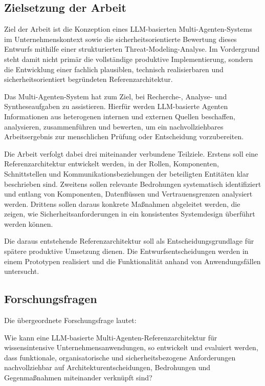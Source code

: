 \newpage

\subsection{Zielsetzung der Arbeit}

Ziel der Arbeit ist die Konzeption eines LLM-basierten Multi-Agenten-Systems im Unternehmenskontext sowie die sicherheitsorientierte Bewertung dieses Entwurfs mithilfe einer strukturierten Threat-Modeling-Analyse. Im Vordergrund steht damit nicht primär die vollständige produktive Implementierung, sondern die Entwicklung einer fachlich plausiblen, technisch realisierbaren und sicherheitsorientiert begründeten Referenzarchitektur.

Das Multi-Agenten-System hat zum Ziel, bei Recherche-, Analyse- und Syntheseaufgaben zu assistieren. Hierfür werden LLM-basierte Agenten Informationen aus heterogenen internen und externen Quellen beschaffen, analysieren, zusammenführen und bewerten, um ein nachvollziehbares Arbeitsergebnis zur menschlichen Prüfung oder Entscheidung vorzubereiten.

Die Arbeit verfolgt dabei drei miteinander verbundene Teilziele. Erstens soll eine Referenzarchitektur entwickelt werden, in der Rollen, Komponenten, Schnittstellen und Kommunikationsbeziehungen der beteiligten Entitäten klar beschrieben sind. Zweitens sollen relevante Bedrohungen systematisch identifiziert und entlang von Komponenten, Datenflüssen und Vertrauensgrenzen analysiert werden. Drittens sollen daraus konkrete Maßnahmen abgeleitet werden, die zeigen, wie Sicherheitsanforderungen in ein konsistentes Systemdesign überführt werden können. \cite{owasp_owasp_nodate, wong_adding_2000, krawiecka_extending_2025}

 Die daraus entstehende Referenzarchitektur soll als Entscheidungsgrundlage für spätere produktive Umsetzung dienen. Die Entwurfsentscheidungen werden in einem Prototypen realisiert und die Funktionalität anhand von Anwendungsfällen untersucht.

\newpage

\subsection{Forschungsfragen}

Die übergeordnete Forschungsfrage lautet:

Wie kann eine LLM-basierte Multi-Agenten-Referenzarchitektur für wissensintensive Unternehmensanwendungen, so entwickelt und evaluiert werden, dass funktionale, organisatorische und sicherheitsbezogene Anforderungen nachvollziehbar auf Architekturentscheidungen, Bedrohungen und Gegenmaßnahmen  miteinander verknüpft sind?

